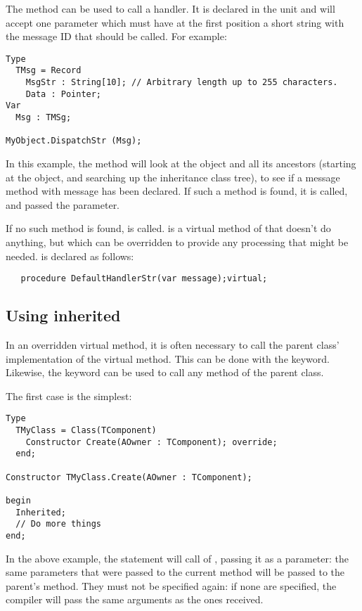 The   method can be used to call a 
handler. It is declared in the  unit and will accept one parameter
which must have at the first position a short string with the message ID that
should be called. For example:
\begin{verbatim}
Type
  TMsg = Record
    MsgStr : String[10]; // Arbitrary length up to 255 characters.
    Data : Pointer;
Var
  Msg : TMSg;

MyObject.DispatchStr (Msg);
\end{verbatim}
In this example, the  method will look at the object and
all its ancestors (starting at the object, and searching up the inheritance
class tree), to see if a message method with message  has been
declared. If such a method is found, it is called, and passed the
 parameter.

If no such method is found,  is called.
 is a virtual method of  that doesn't do
anything, but which can be overridden to provide any processing that might be
needed.  is declared as follows:
\begin{verbatim}
   procedure DefaultHandlerStr(var message);virtual;
\end{verbatim}

\subsection{Using inherited}
In an overridden virtual method, it is often necessary to call the parent
class' implementation of the virtual method. This can be  done with the
 keyword. Likewise, the  keyword can be used
to call any method of the parent class.

The first case is the simplest:
\begin{verbatim}
Type
  TMyClass = Class(TComponent)
    Constructor Create(AOwner : TComponent); override;
  end;

Constructor TMyClass.Create(AOwner : TComponent);

begin
  Inherited;
  // Do more things
end;
\end{verbatim}
In the above example, the  statement will call 
of , passing it  as a parameter: the same
parameters that were passed to the current method will be passed to the
parent's method. They must not be specified again: if none are specified,
the compiler will pass the same arguments as the ones received.

